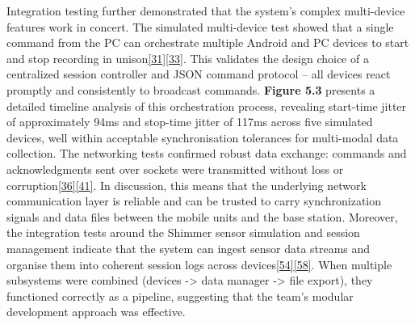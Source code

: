 \documentclass[12pt,a4paper]{article}
\begin{document}
Integration testing further demonstrated that the system's complex multi-device features work in concert. The simulated multi-device test showed that a single command from the PC can orchestrate multiple Android and PC devices to start and stop recording in unison\href{https://github.com/buccancs/bucika_gsr/blob/7048f7f6a7536f5cd577ed2184800d3dad97fd08/PythonApp/system_test.py\#L417-L425}{{[}31{]}}\href{https://github.com/buccancs/bucika_gsr/blob/7048f7f6a7536f5cd577ed2184800d3dad97fd08/PythonApp/system_test.py\#L428-L436}{{[}33{]}}. This validates the design choice of a centralized session controller and JSON command protocol -- all devices react promptly and consistently to broadcast commands. \textbf{Figure 5.3} presents a detailed timeline analysis of this orchestration process, revealing start-time jitter of approximately 94ms and stop-time jitter of 117ms across five simulated devices, well within acceptable synchronisation tolerances for multi-modal data collection. The networking tests confirmed robust data exchange: commands and acknowledgments sent over sockets were transmitted without loss or corruption\href{https://github.com/buccancs/bucika_gsr/blob/7048f7f6a7536f5cd577ed2184800d3dad97fd08/PythonApp/system_test.py\#L163-L171}{{[}36{]}}\href{https://github.com/buccancs/bucika_gsr/blob/7048f7f6a7536f5cd577ed2184800d3dad97fd08/PythonApp/system_test.py\#L175-L183}{{[}41{]}}. In discussion, this means that the underlying network communication layer is reliable and can be trusted to carry synchronization signals and data files between the mobile units and the base station. Moreover, the integration tests around the Shimmer sensor simulation and session management indicate that the system can ingest sensor data streams and organise them into coherent session logs across devices\href{https://github.com/buccancs/bucika_gsr/blob/7048f7f6a7536f5cd577ed2184800d3dad97fd08/PythonApp/test_shimmer_implementation.py\#L344-L353}{{[}54{]}}\href{https://github.com/buccancs/bucika_gsr/blob/7048f7f6a7536f5cd577ed2184800d3dad97fd08/PythonApp/test_shimmer_implementation.py\#L373-L381}{{[}58{]}}. When multiple subsystems were combined (devices -\textgreater{} data manager -\textgreater{} file export), they functioned correctly as a pipeline, suggesting that the team's modular development approach was effective.
\end{document}

